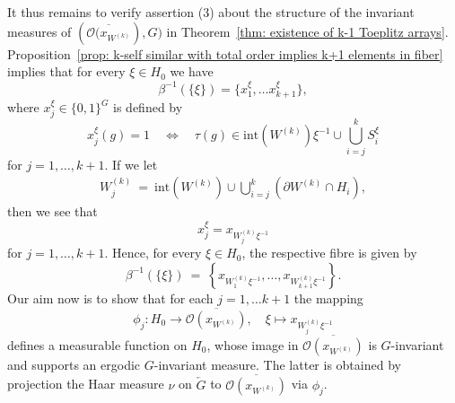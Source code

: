 \documentclass[titlepage,reqno,10pt]{amsart}
\theoremstyle{definition}
\def\cO{{\mathcal O}}
\begin{document}
It thus remains to verify assertion (3) about the structure of the invariant measures of $(\overline{\cO(x_{W^{(k)}}}),G)$ in Theorem~\ref{thm: existence of k-1 Toeplitz arrays}. 
Proposition~\ref{prop: k-self similar with total order implies k+1 elements in fiber} implies that  for every $\xi\in H_0$ we have
$$
\beta^{-1}(\{\xi\}) = \{x^\xi_1 ,\ldots x^\xi_{k+1}\},
$$
where $x^\xi_j\in\{0,1\}^G$ is defined by 
$$
x_j^\xi(g)=1 \quad \Longleftrightarrow \quad \tau(g) \in \mathrm{int}(W^{(k)})\xi^{-1} \cup \bigcup_{i=j}^k S_i^\xi $$
for $j=1,\ldots , k+1$. If we let 
\begin{align*}
 W_j^{(k)} %
  \ = \ \mathrm{int}(W^{(k)}) \cup\bigcup_{i=j}^k(\partial W^{(k)} \cap H_i),
\end{align*}
then we see that 
$$
x_j^\xi = x_{W_j^{(k)}\xi^{-1}}$$
for $j=1,\ldots,k+1$. Hence, for every $\xi\in H_0$, the respective fibre is given by 
$$
  \beta^{-1}(\{\xi\})\ = \ \left\{ x_{W^{(k)}_1\xi^{-1}}, \ldots, x_{W^{(k)}_{k+1}\xi^{-1}}\right\}.
$$
Our aim now is to show that for each $j=1,\ldots k+1$ the mapping $$\phi_j : H_0 \to \overline{\cO(x_{W^{(k)}})} , \quad \xi\mapsto x_{W^{(k)}_j\xi^{-1}}$$ defines a measurable function on $H_0$, whose image in $\overline{\cO(x_{W^{(k)}})}$ is $G$-invariant and supports an ergodic $G$-invariant measure. The latter is obtained by projection the Haar measure $\nu$ on $\overleftarrow{G}$ to $\overline{\cO(x_{W^{(k)}})}$ via $\phi_j$. \medskip
\end{document}

